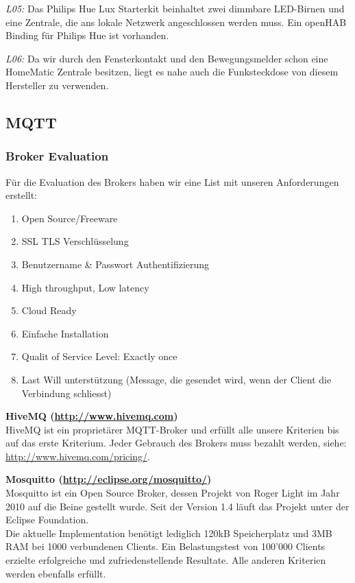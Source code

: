 \textit{L05:} Das Philips Hue Lux Starterkit beinhaltet zwei dimmbare LED-Birnen und eine Zentrale, die ans lokale Netzwerk angeschlossen werden muss. Ein openHAB Binding für Philips Hue ist vorhanden.

\textit{L06:} Da wir durch den Fensterkontakt und den Bewegungsmelder schon eine HomeMatic Zentrale besitzen, liegt es nahe auch die Funksteckdose von diesem Hersteller zu verwenden.

\subsection{MQTT}
\subsubsection{Broker Evaluation}
Für die Evaluation des Brokers haben wir eine List mit unseren Anforderungen erstellt: 

\begin{enumerate}
	\item Open Source/Freeware
	\item SSL TLS Verschlüsselung
	\item Benutzername \& Passwort Authentifizierung
	\item High throughput, Low latency
	\item Cloud Ready
	\item Einfache Installation
	\item Qualit of Service Level: Exactly once
	\item Last Will unterstützung (Message, die gesendet wird, wenn der Client die Verbindung schliesst)
\end{enumerate}

\textbf{HiveMQ (\url{http://www.hivemq.com})} \\
HiveMQ ist ein proprietärer MQTT-Broker und erfüllt alle unsere Kriterien bis auf das erste Kriterium. Jeder Gebrauch des Brokers muss bezahlt werden, siehe: \url{http://www.hivemq.com/pricing/}.

\textbf{Mosquitto (\url{http://eclipse.org/mosquitto/})}\\
Mosquitto ist ein Open Source Broker, dessen Projekt von Roger Light im Jahr 2010 auf die Beine gestellt wurde. Seit der Version 1.4 läuft das Projekt unter der Eclipse Foundation. \\
Die aktuelle Implementation benötigt lediglich 120kB Speicherplatz und 3MB RAM bei 1000 verbundenen Clients. Ein Belastungstest von 100'000 Clients erzielte erfolgreiche und zufriedenstellende Resultate.
Alle anderen Kriterien werden ebenfalls erfüllt.

